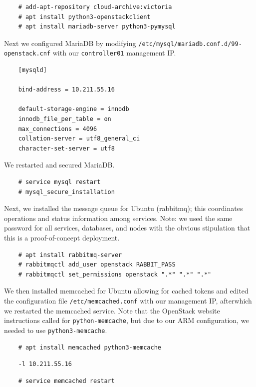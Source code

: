 \documentclass{article}
\begin{document}
\begin{verbatim}
    # add-apt-repository cloud-archive:victoria
    # apt install python3-openstackclient
    # apt install mariadb-server python3-pymysql
\end{verbatim}

Next we configured MariaDB by modifying \texttt{/etc/mysql/mariadb.conf.d/99-openstack.cnf} with our \texttt{controller01} management IP.

\begin{verbatim}
    [mysqld]

    bind-address = 10.211.55.16

    default-storage-engine = innodb
    innodb_file_per_table = on
    max_connections = 4096
    collation-server = utf8_general_ci
    character-set-server = utf8
\end{verbatim}

We restarted and secured MariaDB.

\begin{verbatim}
    # service mysql restart
    # mysql_secure_installation
\end{verbatim}

Next, we installed the message queue for Ubuntu (rabbitmq); this coordinates operations and status information among services. Note: we used the same password for all services, databases, and nodes with the obvious stipulation that this is a proof-of-concept deployment.

\begin{verbatim}
    # apt install rabbitmq-server
    # rabbitmqctl add_user openstack RABBIT_PASS
    # rabbitmqctl set_permissions openstack ".*" ".*" ".*"
\end{verbatim}

We then installed memcached for Ubuntu allowing for cached tokens and edited the configuration file \texttt{/etc/memcached.conf} with our management IP, afterwhich we restarted the memcached service. Note that the OpenStack website instructions called for \texttt{python-memcache}, but due to our ARM configuration, we needed to use \texttt{python3-memcache}.

\begin{verbatim}
    # apt install memcached python3-memcache
\end{verbatim}
\begin{verbatim}
    -l 10.211.55.16
\end{verbatim}
\begin{verbatim}
    # service memcached restart
\end{verbatim}
\end{document}
